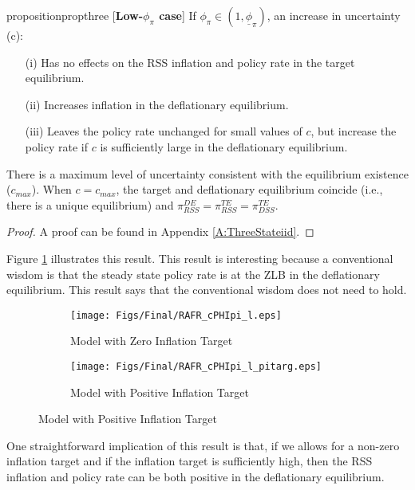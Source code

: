 \documentclass[11pt]{article}
\begin{document}
	\begin{restatable}{proposition}{propthree}\label{prop:prop3}
		[\textbf{Low-$\phi_{\pi}$ case}] If $\phi_{\pi}\in(1,\underline{\phi}_{\pi})$, an increase in uncertainty (c):
		\begin{itemize}
			\item[(i)]  Has no effects on the RSS inflation and policy rate in the target equilibrium.
			\item[(ii)]  Increases inflation in the deflationary equilibrium.
			\item[(iii)] Leaves the policy rate unchanged for small values of $c$, but increase the policy rate if $c$ is sufficiently large  in the deflationary equilibrium.
		\end{itemize}
		There is a maximum level of uncertainty consistent with the equilibrium existence ($c_{max}$). When $c=c_{max}$, the target and deflationary equilibrium coincide (i.e., there is a unique equilibrium) and $\pi_{RSS}^{DE} = \pi_{RSS}^{TE} = \pi_{DSS}^{TE}$. 
	\end{restatable}
	\begin{proof}
		A proof can be found in Appendix \ref{A:ThreeStateiid}.
	\end{proof}
	
	Figure \ref{fig:RAFR_smallcPHIpi} illustrates this result. This result is interesting because a conventional wisdom is that the steady state policy rate is at the ZLB in the deflationary equilibrium. This result says that the conventional wisdom does not need to hold. 
	
	\begin{figure}[t]
		\caption{Risky Steady States:  $\phi_{\pi}\in(1,\underline{\phi}_{\pi})$}
		\begin{center}
			\begin{subfigure}[b]{0.499\textwidth}
				\centering
				\texttt{[image: Figs/Final/RAFR\_cPHIpi\_l.eps]}
				\caption{Model with Zero Inflation Target}
				\label{fig:RAFR_smallcPHIpi}
			\end{subfigure}
			\begin{subfigure}[b]{0.49\textwidth}
				\centering
				\texttt{[image: Figs/Final/RAFR\_cPHIpi\_l\_pitarg.eps]}
				\caption{Model with Positive Inflation Target}
				\label{fig:RAFR_smallcPHIpi_inftarg}
			\end{subfigure}
		\end{center}
	\end{figure}
	
	One straightforward implication of this result is that, if we allows for a non-zero inflation target and if the inflation target is sufficiently high, then the RSS inflation and policy rate can be both positive in the deflationary equilibrium.
		
\end{document}
